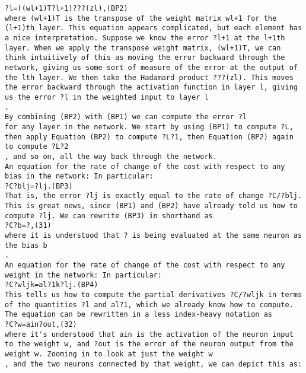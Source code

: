 \begin{lstlisting}
?l=((wl+1)T?l+1)???(zl),(BP2)
where (wl+1)T is the transpose of the weight matrix wl+1 for the (l+1)th layer. This equation appears complicated, but each element has a nice interpretation. Suppose we know the error ?l+1 at the l+1th layer. When we apply the transpose weight matrix, (wl+1)T, we can think intuitively of this as moving the error backward through the network, giving us some sort of measure of the error at the output of the lth layer. We then take the Hadamard product ???(zl). This moves the error backward through the activation function in layer l, giving us the error ?l in the weighted input to layer l
.
By combining (BP2) with (BP1) we can compute the error ?l
for any layer in the network. We start by using (BP1) to compute ?L, then apply Equation (BP2) to compute ?L?1, then Equation (BP2) again to compute ?L?2
, and so on, all the way back through the network.
An equation for the rate of change of the cost with respect to any bias in the network: In particular: 
?C?blj=?lj.(BP3)
That is, the error ?lj is exactly equal to the rate of change ?C/?blj. This is great news, since (BP1) and (BP2) have already told us how to compute ?lj. We can rewrite (BP3) in shorthand as 
?C?b=?,(31)
where it is understood that ? is being evaluated at the same neuron as the bias b
.
An equation for the rate of change of the cost with respect to any weight in the network: In particular: 
?C?wljk=al?1k?lj.(BP4)
This tells us how to compute the partial derivatives ?C/?wljk in terms of the quantities ?l and al?1, which we already know how to compute. The equation can be rewritten in a less index-heavy notation as 
?C?w=ain?out,(32)
where it's understood that ain is the activation of the neuron input to the weight w, and ?out is the error of the neuron output from the weight w. Zooming in to look at just the weight w
, and the two neurons connected by that weight, we can depict this as: 


\end{lstlisting}
